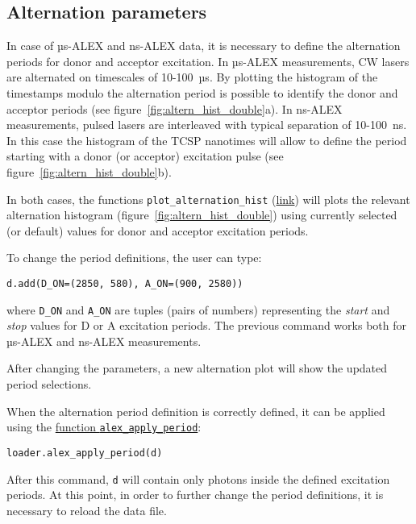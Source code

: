 \subsection{Alternation parameters}
\label{sec:alternation}

In case of µs-ALEX and ns-ALEX data, it is necessary to define the
alternation periods for donor and acceptor excitation. 
In µs-ALEX measurements, CW lasers are alternated on timescales of 10-100~µs.
By plotting the histogram of the timestamps modulo the alternation period
is possible to identify the donor and acceptor periods (see figure~\ref{fig:altern_hist_double}a).
In ns-ALEX measurements, pulsed lasers are interleaved with typical separation of 10-100~ns.
In this case the histogram of the TCSP nanotimes will allow to define the period
starting with a donor (or acceptor) excitation pulse (see figure~\ref{fig:altern_hist_double}b).

In both cases, the functions
\verb|plot_alternation_hist| 
(\href{http://fretbursts.readthedocs.org/en/latest/plots.html#fretbursts.burst_plot.plot_alternation_hist}{link})
will plots the relevant alternation histogram (figure~\ref{fig:altern_hist_double}) 
using currently selected (or default) values for donor and acceptor excitation periods.

To change the period definitions, the user can type:

\begin{lstlisting}
d.add(D_ON=(2850, 580), A_ON=(900, 2580))
\end{lstlisting}

where \verb|D_ON| and \verb|A_ON| are tuples (pairs of numbers) representing
the \textit{start} and \textit{stop} values for D or A excitation periods.
The previous command works both for µs-ALEX and ns-ALEX measurements.

After changing the parameters, a new alternation plot will show the updated 
period selections.

When the alternation period definition is correctly defined, it can
be applied using the
\href{http://fretbursts.readthedocs.org/en/latest/loader.html#fretbursts.loader.alex_apply_period}{function \texttt{alex\_apply\_period}}:

\begin{lstlisting}
loader.alex_apply_period(d)
\end{lstlisting}

After this command, \verb|d| will contain only photons inside the defined excitation periods. 
At this point, in order to further change the period definitions,
it is necessary to reload the data file.
